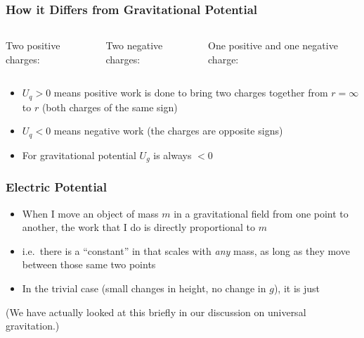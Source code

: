 \documentclass[12pt,aspectratio=169]{beamer}
\begin{document}
\begin{frame}
  \frametitle{How it Differs from Gravitational Potential}
  \begin{columns}
    \begin{center}
      Two positive charges:

      \vspace{-0.3in}{\Large
        \begin{displaymath}
          U_q>0
        \end{displaymath}
      }
    \end{center}
    \begin{center}
      Two negative charges:

      \vspace{-0.3in}{\Large
        \begin{displaymath}
          U_q>0
        \end{displaymath}
      }
    \end{center}
    \begin{center}
      One positive and one negative charge:

      \vspace{-0.5in}{\Large
        \begin{displaymath}
          U_q<0
        \end{displaymath}
      }
    \end{center}
  \end{columns}

  \vspace{.4in}
  \begin{itemize}
  \item $U_q>0$ means positive work is done to bring two charges together from
   $r=\infty$ to $r$ (both charges of the same sign)
  \item $U_q<0$ means negative work (the charges are opposite signs)
  \item For gravitational potential $U_g$ is always $<0$
  \end{itemize}
\end{frame}

\begin{frame}
  \frametitle{Electric Potential}
  \begin{itemize}
  \item When I move an object of mass $m$ in a gravitational field from one
    point to another, the work that I do is directly proportional to $m$
  \item i.e.\ there is a ``constant'' in that scales with \emph{any} mass, as
    long as they move between those same two points
  \item In the trivial case (small changes in height, no change in $g$), it is
    just

  \end{itemize}
  (We have actually looked at this briefly in our discussion on universal
  gravitation.)
\end{frame}
\end{document}
